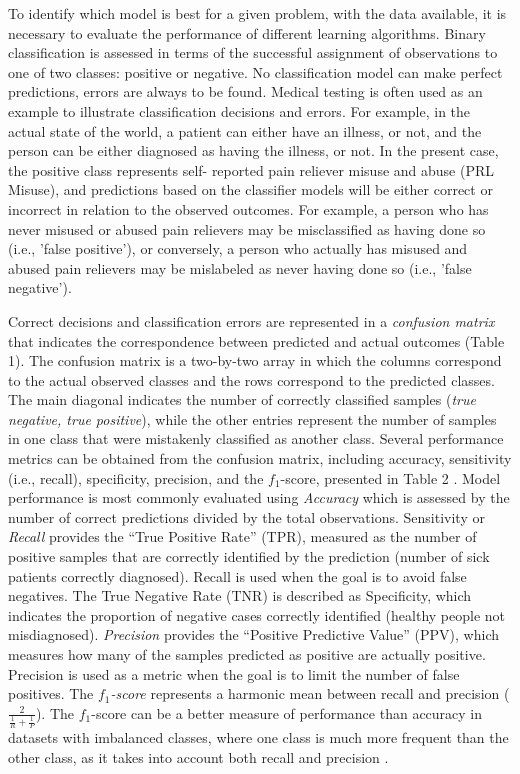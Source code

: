 \documentclass[sigconf]{acmart}
\begin{document}
To identify which model is best for a given problem, with the data available, 
it is necessary to evaluate the performance of different learning algorithms. 
Binary classification is assessed in terms of the successful assignment of 
observations to one of two classes: positive or negative. No classification 
model can make perfect predictions, errors are always to be found. Medical 
testing is often used as an example to illustrate classification decisions 
and errors. For example, in the actual state of the world, a patient can either 
have an illness, or not, and the person can be either diagnosed as having the 
illness, or not. In the present case, the positive class represents self-
reported pain reliever misuse and abuse (PRL Misuse), and predictions based on 
the classifier models will be either correct or incorrect in relation to the 
observed outcomes. For example, a person who has never misused or abused pain 
relievers may be misclassified as having done so (i.e., 'false positive'), or 
conversely, a person who actually has misused and abused pain relievers may 
be mislabeled as never having done so (i.e., 'false negative').


Correct decisions and classification errors are represented in a 
\emph{confusion matrix} that indicates the correspondence between predicted 
and actual outcomes (Table 1). The confusion matrix is a two-by-two array in 
which the columns correspond to the actual observed classes and the rows 
correspond to the predicted classes. The main diagonal indicates the number 
of correctly classified samples (\emph{true negative, true positive}), while 
the other entries represent the number of samples in one class that were 
mistakenly classified as another class. Several performance metrics can be 
obtained from the confusion matrix, including accuracy, sensitivity (i.e., 
recall), specificity, precision, and the $f_1$-score, presented in Table 2 
\cite{kuhn13, wiki18}. Model performance is most commonly evaluated using 
\emph{Accuracy} which is assessed by the number of correct predictions 
divided by the total observations. Sensitivity or \emph{Recall} provides the 
``True Positive Rate'' (TPR), measured as the number of positive samples that 
are correctly identified by the prediction (number of sick patients correctly
diagnosed). Recall is used when the goal is to avoid false negatives. The 
True Negative Rate (TNR) is described as Specificity, which indicates the 
proportion of negative cases correctly identified (healthy people not 
misdiagnosed). \emph{Precision} provides the ``Positive Predictive Value'' 
(PPV), which measures how many of the samples predicted as positive are 
actually positive. Precision is used as a metric when the goal is to limit
the number of false positives. The \emph{$f_1$-score} represents a harmonic 
mean between recall and precision (\(\frac{2}{ \frac{1}{R} + \frac{1}{P} }\)). 
The $f_1$-score can be a better measure of performance than accuracy in 
datasets with imbalanced classes, where one class is much more frequent 
than the other class, as it takes into account both recall and precision 
\cite{muller17, yun09}.
\end{document}
